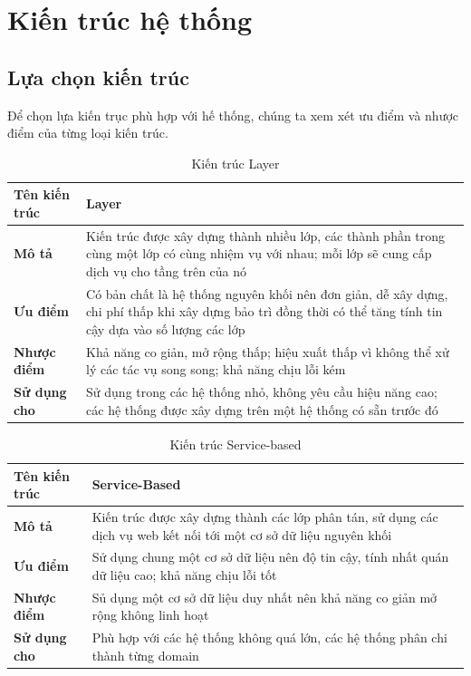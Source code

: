 
\section{Kiến trúc hệ thống}
\subsection{Lựa chọn kiến trúc}

\hspace*{0.5cm}Để chọn lựa kiến trục phù hợp với hế thống, chúng ta xem xét ưu điểm và nhược điểm của từng loại kiến trúc.\\

\begin{table}
	\begin{tabular}{|p{3cm}|p{12cm}|}
		\hline
		\textbf{Tên kiến trúc} & Layer\\
		\hline
		\textbf{Mô tả}         & Kiến trúc được xây dựng thành nhiều lớp, các thành phần trong cùng một lớp có cùng nhiệm vụ với nhau; mỗi lớp sẽ cung cấp dịch vụ cho tầng trên của nó \\
		\hline
		\textbf{Ưu điểm}       & Có bản chất là hệ thống nguyên khối nên đơn giản, dễ xây dựng, chi phí thấp khi xây dựng bảo trì đồng thời có thể tăng tính tin cậy dựa vào số lượng các lớp \\
		\hline
		\textbf{Nhược điểm}    & Khả năng co giản, mở rộng thấp; hiệu xuất thấp vì không thể xử lý các tác vụ song song; khả năng chịu lỗi kém\\
		\hline
		\textbf{Sử dụng cho}   & Sử dụng trong các hệ thống nhỏ, không yêu cầu hiệu năng cao; các hệ thống được xây dựng trên một hệ thống có sẵn trước đó \\
		\hline
	\end{tabular}
	\caption{Kiến trúc Layer}
\end{table}


\begin{table}
	\begin{tabular}{|p{3cm}|p{12cm}|}
		\hline
		\textbf{Tên kiến trúc} & Service-Based\\
		\hline
		\textbf{Mô tả}         & Kiến trúc được xây dựng thành các lớp phân tán, sử dụng các dịch vụ web kết nối tới một cơ sở dữ liệu nguyên khối     \\
		\hline
		\textbf{Ưu điểm}       & Sử dụng chung một cơ sở dữ liệu nên độ tin cậy, tính nhất quán dữ liệu cao; khả năng chịu lỗi tốt \\
		\hline
		\textbf{Nhược điểm}    & Sủ dụng một cơ sở dữ liệu duy nhất nên khả năng co giản mở rộng không linh hoạt   \\
		\hline
		\textbf{Sử dụng cho}   & Phù hợp với các hệ thống không quá lớn, các hệ thống phân chi thành từng domain                   \\
		\hline
	\end{tabular}
	\caption{Kiến trúc Service-based}
\end{table}

